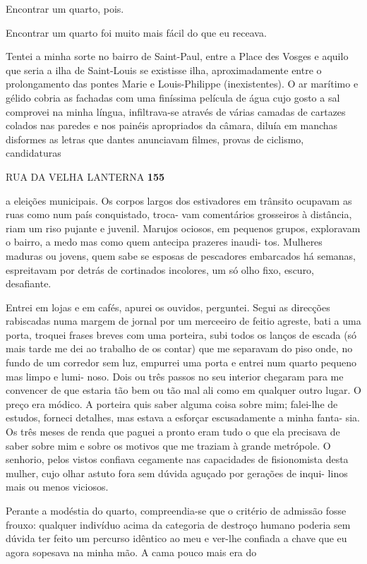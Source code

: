 Encontrar um quarto, pois.

Encontrar um quarto foi muito mais fácil do que eu receava.

Tentei a minha sorte no bairro de Saint-Paul, entre a Place des Vosges e
aquilo que seria a ilha de Saint-Louis se existisse ilha,
aproximadamente entre o prolongamento das pontes Marie e Louis-Philippe
(inexistentes). O ar marítimo e gélido cobria as fachadas com uma
finíssima película de água cujo gosto a sal comprovei na minha língua,
infiltrava-se através de várias camadas de cartazes colados nas paredes
e nos painéis apropriados da câmara, diluía em manchas disformes as
letras que dantes anunciavam filmes, provas de ciclismo, candidaturas

RUA DA VELHA LANTERNA \textbf{155}

a eleições municipais. Os corpos largos dos estivadores em trânsito
ocupavam as ruas como num país conquistado, troca- vam comentários
grosseiros à distância, riam um riso pujante e juvenil. Marujos ociosos,
em pequenos grupos, exploravam o bairro, a medo mas como quem antecipa
prazeres inaudi- tos. Mulheres maduras ou jovens, quem sabe se esposas
de pescadores embarcados há semanas, espreitavam por detrás de
cortinados incolores, um só olho fixo, escuro, desafiante.

Entrei em lojas e em cafés, apurei os ouvidos, perguntei. Segui as
direcções rabiscadas numa margem de jornal por um merceeiro de feitio
agreste, bati a uma porta, troquei frases breves com uma porteira, subi
todos os lanços de escada (só mais tarde me dei ao trabalho de os
contar) que me separavam do piso onde, no fundo de um corredor sem luz,
empurrei uma porta e entrei num quarto pequeno mas limpo e lumi- noso.
Dois ou três passos no seu interior chegaram para me convencer de que
estaria tão bem ou tão mal ali como em qualquer outro lugar. O preço era
módico. A porteira quis saber alguma coisa sobre mim; falei-lhe de
estudos, forneci detalhes, mas estava a esforçar escusadamente a minha
fanta- sia. Os três meses de renda que paguei a pronto eram tudo o que
ela precisava de saber sobre mim e sobre os motivos que me traziam à
grande metrópole. O senhorio, pelos vistos confiava cegamente nas
capacidades de fisionomista desta mulher, cujo olhar astuto fora sem
dúvida aguçado por gerações de inqui- linos mais ou menos viciosos.

Perante a modéstia do quarto, compreendia-se que o critério de admissão
fosse frouxo: qualquer indivíduo acima da categoria de destroço humano
poderia sem dúvida ter feito um percurso idêntico ao meu e ver-lhe
confiada a chave que eu agora sopesava na minha mão. A cama pouco mais
era do

